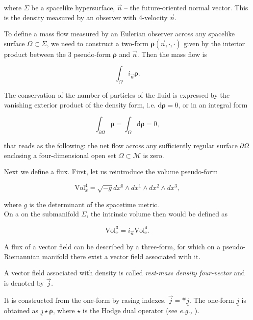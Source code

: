 \documentclass[11pt,a4paper,headinclude=true,DIV=14,BCOR=8mm,chapterprefix,listof=totoc,twoside,openright,abstracton]{scrbook}
\begin{document}
where $\Sigma$ be a spacelike hypersurface,  $\vec{n}$ -- the future-oriented normal vector. This is the density measured by an observer with 4-velocity $\vec{n}$. 

To define a mass flow measured by an Eulerian observer across any spacelike surface $\Omega\subset\Sigma$, we need to construct a two-form $\boldsymbol{\rho}(\vec{n}, \cdot, \cdot)$ given by the interior product between the 3 pseudo-form $\boldsymbol{\rho}$ and $\vec{n}$. Then the mass flow is 

\begin{equation}
\int_{\Omega} i_{\vec{n}}\boldsymbol{\rho}.
\end{equation}

The conservation of the number of particles of the fluid is expressed by the vanishing exterior product of the density form, i.e. $\text{d}\boldsymbol{\rho}=0$, or in an integral form 

\begin{equation}
\int_{\partial\Omega} \boldsymbol{\rho} = \int_{\Omega}\text{d}\boldsymbol{\rho} = 0,
\end{equation}

that reads as the following: the net flow across any sufficiently regular surface $\partial\Omega$ enclosing a four-dimensional open set $\Omega\subset\mathcal{M}$ is zero.

Next we define a flux. First, let us reintroduce the volume pseudo-form

\begin{equation}
\text{Vol}_x ^4 = \sqrt{-g}dx^0 \wedge dx^1 \wedge dx^2 \wedge dx^3,
\end{equation}

where $g$ is the determinant of the spacetime metric. \\
On a on the submanifold $\Sigma$, the intrinsic volume then would be defined as 

\begin{equation}
\text{Vol}_x ^3 = i_{\vec{n}} \text{Vol}_x ^4.
\end{equation}

A flux of a vector field can be described by a three-form, for which on a pseudo-Riemannian manifold there exist a vector field associated with it.

A vector field associated with density is called \textit{rest-mass density four-vector} and is denoted by $\vec{j}$.

It is constructed from the one-form by rasing indexes, $\vec{j} = {^{\#}\underline{j}}$. The one-form $\underline{j}$ is obtained as $\underline{j}\star\boldsymbol{\rho}$, where $\star$ is the Hodge dual operator (see \textit{e.g.,} \cite{Frankel:1982dva}). 
\end{document}
